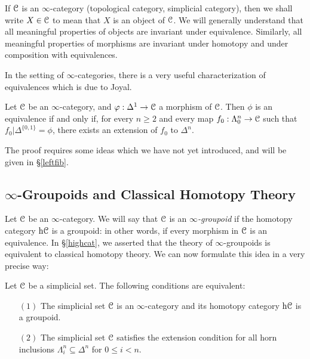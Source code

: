 \begin{Didn't Read}
If $\operatorname{\mathcal{C}}$ is an $\infty$-category (topological category, simplicial category), then we
shall write $X \in \operatorname{\mathcal{C}}$ to mean that $X$ is an object of
$\operatorname{\mathcal{C}}$. We will generally understand that all meaningful properties of
objects are invariant under equivalence. Similarly, all
meaningful properties of morphisms are invariant under
homotopy and under composition with equivalences.

In the setting of $\infty$-categories, there is a very useful characterization of equivalences which is due to Joyal.

\begin{proposition}\label{greenlem}
Let $\operatorname{\mathcal{C}}$ be an $\infty$-category, and $\varphi: \Delta^1 \rightarrow \operatorname{\mathcal{C}}$ a morphism of $\operatorname{\mathcal{C}}$. Then $\phi$ is an equivalence if and only if, for every $n \geq 2$ and every map
$f_0: \Lambda^n_0 \rightarrow \operatorname{\mathcal{C}}$ such that $f_0 | \Delta^{\{0,1\}} = \phi$,
there exists an extension of $f_0$ to $\Delta^n$.
\end{proposition}

The proof requires some ideas which we have not yet introduced, and will be given in \S \ref{leftfib}.

\subsection{$\infty$-Groupoids and Classical Homotopy Theory}

Let $\operatorname{\mathcal{C}}$ be an $\infty$-category. We will say that $\operatorname{\mathcal{C}}$ is an {\it $\infty$-groupoid} if the homotopy category $\rm{h} \it{\operatorname{\mathcal{C}}}$ is a groupoid: in other words, if every morphism in $\operatorname{\mathcal{C}}$ is an equivalence. In \S \ref{highcat}, we asserted that the theory of $\infty$-groupoids is equivalent to classical homotopy theory. We can now formulate this idea in a very precise way:

\begin{proposition}\label{greenwich}
Let $\operatorname{\mathcal{C}}$ be a simplicial set. The following conditions are
equivalent:

\begin{itemize}
\item[$(1)$] The simplicial set $\operatorname{\mathcal{C}}$ is an $\infty$-category and its homotopy category $\rm{h} \it{\operatorname{\mathcal{C}}}$ is a groupoid.

\item[$(2)$] The simplicial set $\operatorname{\mathcal{C}}$ satisfies the extension condition
for all horn inclusions $\Lambda^n_i \subseteq \Delta^n$ for $0 \leq i < n$.


\end{itemize}
\end{proposition}
\end{Didn't Read}

